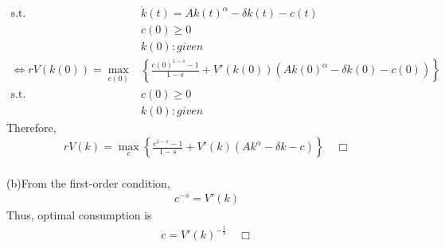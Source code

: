 \documentclass{article}
\begin{document}
\begin{CJK}{UTF8}{min}
\begin{align*}
\mathrm{s.t.} \,\,&\dot k(t)=Ak(t)^\alpha -\delta k(t)-c(t)\\
&c(0)\geq0\\
&k(0):given\\
\Leftrightarrow rV(k(0))=\max_{c(0)}&\left\{\frac{c(0)^{1-s}-1}{1-s}+V'(k(0))(Ak(0)^\alpha-\delta k(0)-c(0))\right\}\\
\mathrm{s.t.} \,\,&c(0)\geq0\\
&k(0):given
\end{align*}
Therefore,
\begin{align*}
rV(k)=\max_c\left\{\frac{c^{1-s}-1}{1-s}+V'(k)(Ak^\alpha-\delta k-c)\right\}\quad\Box
\end{align*}\\
(b)\quad From the first-order condition,
\begin{align*}
c^{-s}=V'(k)
\end{align*}
Thus, optimal consumption is 
\begin{align*}
c=V'(k)^{-\frac1s}\quad \Box
\end{align*}

\end{CJK}
\end{document}
